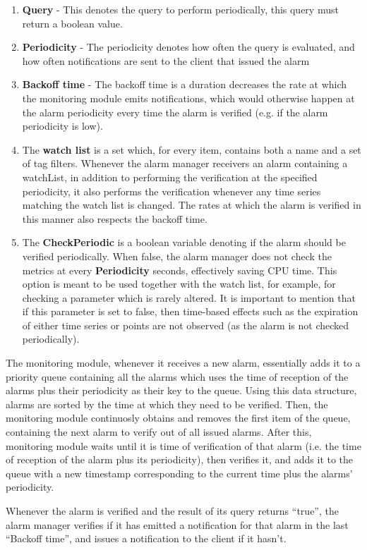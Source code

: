\begin{enumerate}
    \item \textbf{Query} - This denotes the query to perform periodically, this query must return a boolean value.
    
    \item \textbf{Periodicity} - The periodicity denotes how often the query is evaluated, and how often notifications are sent to the client that issued the alarm
    
    \item \textbf{Backoff time} - The backoff time is a duration decreases the rate at which the monitoring module emits notifications, which would otherwise happen at the alarm periodicity every time the alarm is verified (e.g. if the alarm periodicity is low).
    
    \item The \textbf{watch list} is a set which, for every item, contains both a name and a set of tag filters. Whenever the alarm manager receivers an alarm containing a watchList, in addition to performing the verification at the specified periodicity, it also performs the verification whenever any time series matching the watch list is changed. The rates at which the alarm is verified in this manner also respects the backoff time.
    
    \item The \textbf{CheckPeriodic} is a boolean variable denoting if the alarm should be verified periodically. When false, the alarm manager does not check the metrics at every \textbf{Periodicity} seconds, effectively saving CPU time. This option is meant to be used together with the watch list, for example, for checking a parameter which is rarely altered. It is important to mention that if this parameter is set to false, then time-based effects such as the expiration of either time series or points are not observed (as the alarm is not checked periodically).
\end{enumerate}

The monitoring module, whenever it receives a new alarm, essentially adds it to a priority queue containing all the alarms which uses the time of reception of the alarms plus their periodicity as their key to the queue. Using this data structure, alarms are sorted by the time at which they need to be verified. Then, the monitoring module continuosly obtains and removes the first item of the queue, containing the next alarm to verify out of all issued alarms. After this, monitoring module waits until it is time of verification of that alarm (i.e. the time of reception of the alarm plus its periodicity), then verifies it, and adds it to the queue with a new timestamp corresponding to the current time plus the alarms' periodicity.

Whenever the alarm is verified and the result of its query returns ``true'', the alarm manager verifies if it has emitted a notification for that alarm in the last ``Backoff time'', and issues a notification to the client if it hasn't.


